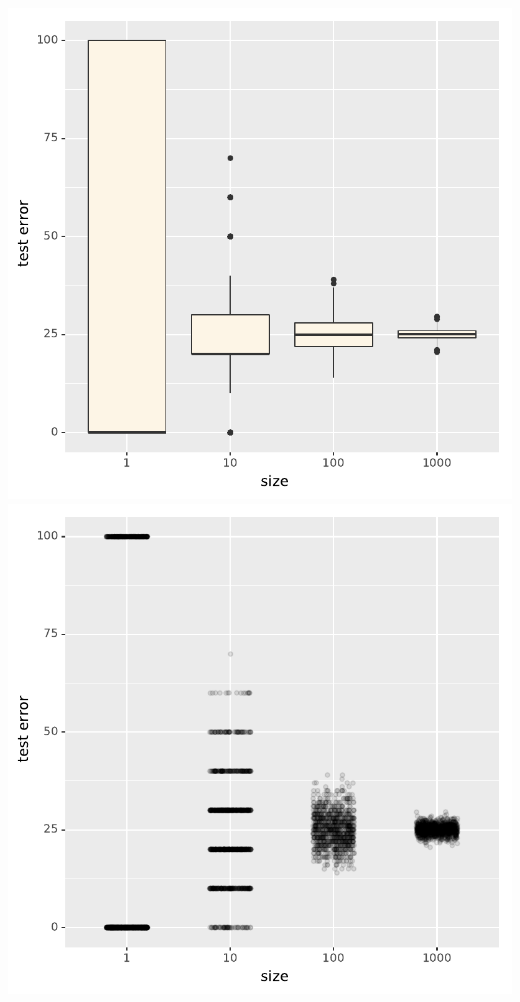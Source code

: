 \documentclass[landscape,footrule]{foils}
\begin{document}
\titlefoil

\enlargethispage{1cm}
\centerline{
\includegraphics[scale=0.8]{test_error_fluctuations_1}\hspace*{0.5cm}
\includegraphics[scale=0.8]{test_error_fluctuations_2}}
\end{document}
